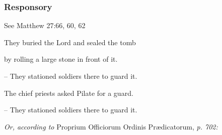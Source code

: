 \vspace{5pt}

\subsubsection{Responsory}
 \hfill See Matthew 27:66, 60, 62
 
 They buried the Lord and sealed the tomb\par
 by rolling a large stone in front of it.\par
 – They stationed soldiers there to guard it.\par
 \vspace{5pt}
 The chief priests asked Pilate for a guard.\par
 – They stationed soldiers there to guard it.
 
 \vspace{5pt}

\textit{Or, according to} Proprium Officiorum Ordinis Prædicatorum, \textit{p. 702:}
